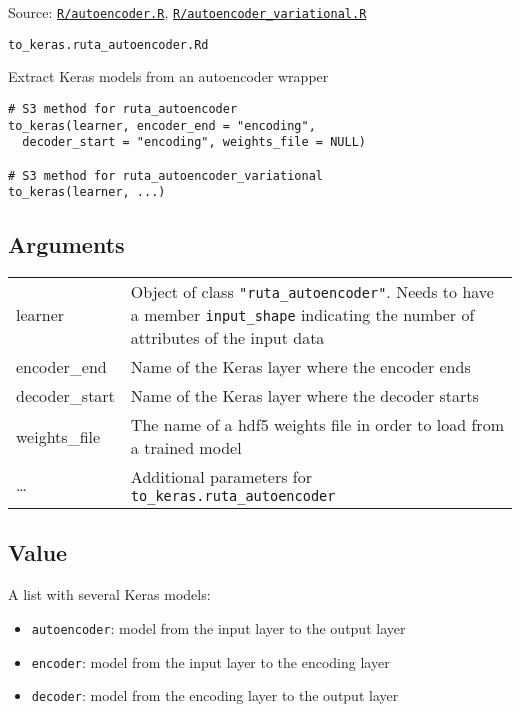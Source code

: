 Source:
\href{https://github.com/fdavidcl/ruta/blob/master/R/autoencoder.R}{\texttt{R/autoencoder.R}},
\href{https://github.com/fdavidcl/ruta/blob/master/R/autoencoder_variational.R}{\texttt{R/autoencoder\_variational.R}}

\texttt{to\_keras.ruta\_autoencoder.Rd}

Extract Keras models from an autoencoder wrapper

\begin{verbatim}
# S3 method for ruta_autoencoder
to_keras(learner, encoder_end = "encoding",
  decoder_start = "encoding", weights_file = NULL)

# S3 method for ruta_autoencoder_variational
to_keras(learner, ...)
\end{verbatim}

\hypertarget{arguments}{\subsection{\texorpdfstring{\protect\hyperlink{arguments}{}Arguments}{Arguments}}\label{arguments}}

\begin{longtable}[c]{@{}ll@{}}
\toprule
learner & Object of class \texttt{"ruta\_autoencoder"}. Needs to have a
member \texttt{input\_shape} indicating the number of attributes of the
input data\tabularnewline
encoder\_end & Name of the Keras layer where the encoder
ends\tabularnewline
decoder\_start & Name of the Keras layer where the decoder
starts\tabularnewline
weights\_file & The name of a hdf5 weights file in order to load from a
trained model\tabularnewline
\ldots{} & Additional parameters for
\texttt{to\_keras.ruta\_autoencoder}\tabularnewline
\bottomrule
\end{longtable}

\hypertarget{value}{\subsection{\texorpdfstring{\protect\hyperlink{value}{}Value}{Value}}\label{value}}

A list with several Keras models:

\begin{itemize}
\item
  \texttt{autoencoder}: model from the input layer to the output layer
\item
  \texttt{encoder}: model from the input layer to the encoding layer
\item
  \texttt{decoder}: model from the encoding layer to the output layer
\end{itemize}

